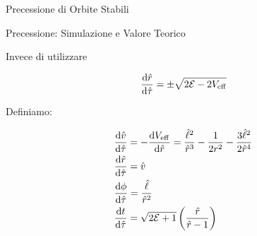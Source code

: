 \begin{frame}{Precessione di Orbite Stabili}
    \centering
\end{frame}


\begin{frame}{Precessione: Simulazione e Valore Teorico}

    Invece di utilizzare

    \begin{equation*}
       \dv{\hat r}{\hat \tau} = \pm \sqrt{2 \mathcal E - 2 V_{\rm eff}}
    \end{equation*}

    Definiamo:

    \begin{align*}[left = {\empheqlbrace}]
        &\dv{\hat v}{\hat \tau} = - \dv{V_{\rm eff}}{\hat r} 
        = \frac{\hat \ell^2}{\hat r^3} - \frac{1}{2 r^2}
        - \frac{3 \hat \ell^2}{2 \hat r^4} \\
        &\dv{\hat r}{\hat \tau} = \hat v \\
        &\dv{\phi}{\hat \tau} = \frac{\hat \ell}{\hat r^2} \\
        &\dv{t}{\hat \tau} = \sqrt{2 \mathcal E + 1}
        \left(\frac{\hat r}{\hat r - 1}\right)
    \end{align*}
\end{frame}


